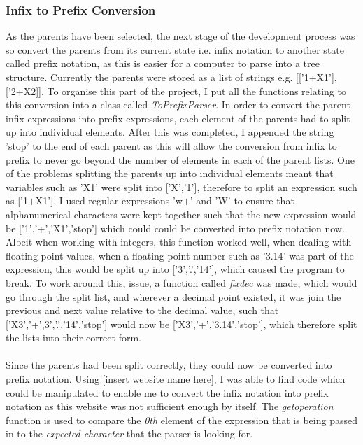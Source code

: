 \documentclass[11pt]{article}
\begin{document}
\subsubsection{Infix to Prefix Conversion}
As the parents have been selected, the next stage of the development process was so convert the parents from its current state i.e. infix notation to another state called prefix notation, as this is easier for a computer to parse into a tree structure.  Currently the parents were stored as a list of strings e.g. [['1+X1'],['2+X2]].
To organise this part of the project, I put all the functions relating to this conversion into a class called \textit{ToPrefixParser}. In order to convert the parent infix expressions into prefix expressions, each element of the parents had to split up into individual elements. After this was completed, I appended the string 'stop' to the end of each parent as this will allow the conversion from infix to prefix to never go beyond the number of elements in each of the parent lists. One of the problems splitting the parents up into individual elements meant that variables such as 'X1' were split into ['X','1'], therefore to split an expression such as ['1+X1'], I used regular expressions 'w+' and 'W' to ensure that alphanumerical characters were kept together such that the new expression would be ['1','+','X1','stop'] which could could be converted into prefix notation now. \\
Albeit when working with integers, this function worked well, when dealing with floating point values, when a floating point number such as '3.14' was part of the expression, this would be split up into ['3','.','14'], which caused the program to break. To work around this, issue, a function called  \textit{fix\textunderscore dec} was made, which would go through the split list, and wherever a decimal point existed, it was join the previous and next value relative to the decimal value, such that ['X3','+',3','.','14','stop'] would now be ['X3','+','3.14','stop'], which therefore split the lists into their correct form. \\
\\
Since the parents had been split correctly, they could now be converted into prefix notation. Using [insert website name here], I was able to find code which could be manipulated to enable me to convert the infix notation into prefix notation as this website was not sufficient enough by itself. The \textit{get\textunderscore operation}  function is used to compare the \textit{0th} element of the expression that is being passed in to the \textit{expected character} that the parser is looking for.
\end{document}
